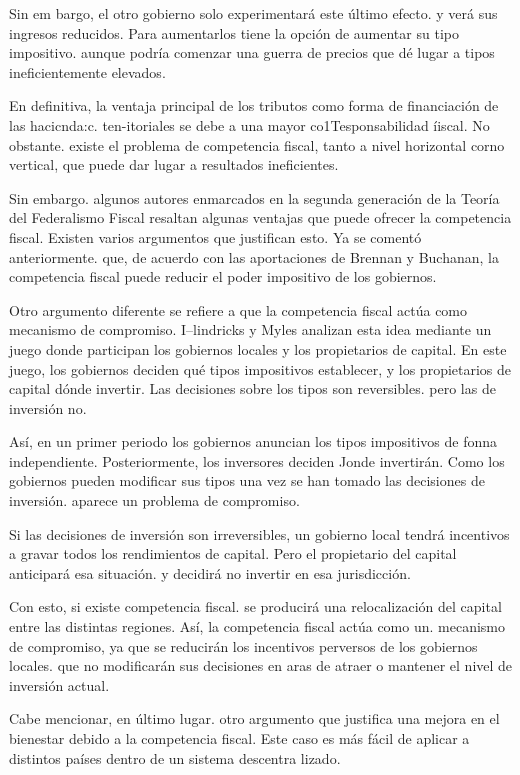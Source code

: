 \documentclass[10pt,a4paper]{article}
\begin{document}
Sin em bargo, el otro gobierno solo experimentará este último efecto. y verá sus ingresos reducidos. Para aumentarlos tiene la opción de aumentar su tipo impositivo. aunque podría comenzar una guerra de precios que dé lugar a tipos ineficientemente elevados.

En definitiva, la ventaja principal de los tributos como forma de financiación de las hacicnda:c. ten-itoriales se debe a una mayor co1Tesponsabilidad íiscal. No obstante. existe el problema de competencia fiscal, tanto a nivel horizontal corno vertical, que puede dar lugar a resultados ineficientes.

Sin embargo. algunos autores enmarcados en la segunda generación de la Teoría del Federalismo Fiscal resaltan algunas ventajas que puede ofrecer la competencia fiscal. Existen varios argumentos que justifican esto. Ya se comentó anteriormente. que, de acuerdo con las aportaciones de Brennan y Buchanan, la competencia fiscal puede reducir el poder impositivo de los gobiernos.

Otro argumento diferente se refiere a que la competencia fiscal actúa como mecanismo de compromiso. I--lindricks y Myles analizan esta idea mediante un juego donde participan los gobiernos locales y los propietarios de capital. En este juego, los gobiernos deciden qué tipos impositivos establecer, y los propietarios de capital dónde invertir. Las decisiones sobre los tipos son reversibles. pero las de inversión no.

Así, en un primer periodo los gobiernos anuncian los tipos impositivos de fonna independiente. Posteriormente, los inversores deciden Jonde invertirán. Como los gobiernos pueden modificar sus tipos una vez se han tomado las decisiones de inversión. aparece un problema de compromiso.

Si las decisiones de inversión son irreversibles, un gobierno local tendrá incentivos a gravar todos  los rendimientos de capital. Pero el propietario del capital anticipará esa situación. y decidirá no invertir en esa jurisdicción.

Con esto, si existe competencia fiscal. se producirá una relocalización del capital entre las distintas regiones. Así, la competencia fiscal actúa como un. mecanismo de compromiso, ya que se reducirán los incentivos perversos de los gobiernos locales. que no modificarán sus decisiones en aras de atraer o mantener el nivel de inversión actual.

Cabe mencionar, en último lugar. otro argumento que justifica una mejora en el bienestar debido a la competencia fiscal. Este caso es más fácil de aplicar a distintos países dentro de un sistema descentra lizado.
\end{document}
